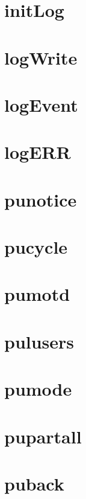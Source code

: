 \documentclass[twoside]{book}
\begin{document}
\chapter{init\-Log}
\label{init_log}
\hypertarget{init_log}{}

\chapter{log\-Write}
\label{log_write}
\hypertarget{log_write}{}

\chapter{log\-Event}
\label{log_event}
\hypertarget{log_event}{}

\chapter{log\-E\-R\-R}
\label{log_e_r_r}
\hypertarget{log_e_r_r}{}

\chapter{punotice}
\label{punotice}
\hypertarget{punotice}{}

\chapter{pucycle}
\label{pucycle}
\hypertarget{pucycle}{}

\chapter{pumotd}
\label{pumotd}
\hypertarget{pumotd}{}

\chapter{pulusers}
\label{pulusers}
\hypertarget{pulusers}{}

\chapter{pumode}
\label{pumode}
\hypertarget{pumode}{}

\chapter{pupartall}
\label{pupartall}
\hypertarget{pupartall}{}

\chapter{puback}
\label{puback}
\hypertarget{puback}{}

\end{document}

